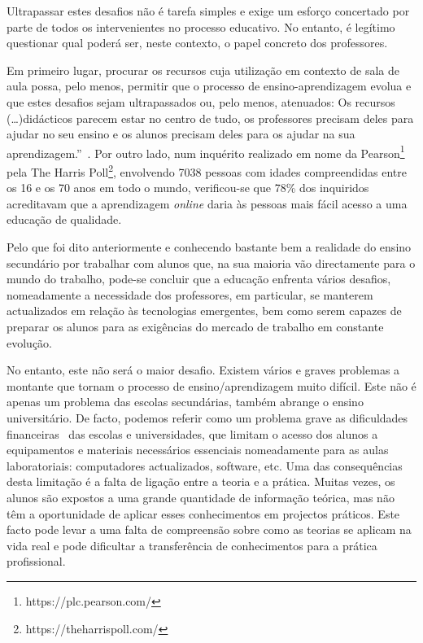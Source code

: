 Ultrapassar estes desafios não é tarefa simples e exige um esforço concertado por parte de todos os intervenientes no processo educativo. No entanto, é legítimo questionar qual poderá ser, neste contexto, o papel concreto dos professores.

Em primeiro lugar, procurar os recursos cuja utilização em contexto de sala de aula possa, pelo menos, permitir que o processo de ensino-aprendizagem evolua e que estes desafios sejam ultrapassados ou, pelo menos, atenuados: Os recursos (\ldots)didácticos parecem estar no centro de tudo, os professores precisam deles para ajudar no seu ensino e os alunos precisam deles para os ajudar na sua aprendizagem.''~\cite{virtuallabng}. Por outro lado, num inquérito \cite{pearson} realizado em nome da Pearson\footnote{https://plc.pearson.com/} pela The Harris Poll\footnote{https://theharrispoll.com/}, envolvendo 7038 pessoas com idades compreendidas entre os 16 e os 70 anos em todo o mundo, verificou-se que 78\% dos inquiridos acreditavam que a aprendizagem \textit{online} daria às pessoas mais fácil acesso a uma educação de qualidade. 

Pelo que foi dito anteriormente e conhecendo bastante bem a realidade do ensino secundário por trabalhar com alunos que, na sua maioria vão directamente para o mundo do trabalho, pode-se concluir que a educação enfrenta vários desafios, nomeadamente a necessidade dos professores, em particular, se manterem actualizados em relação às tecnologias emergentes, bem como serem capazes de preparar os alunos para as exigências do mercado de trabalho em constante evolução.

No entanto, este não será o maior desafio. Existem vários e graves problemas a montante que tornam o processo de ensino/aprendizagem muito difícil. Este não é apenas um problema das escolas secundárias, também abrange o ensino universitário. De facto, podemos referir como um problema grave as dificuldades financeiras~\cite{dificuldadesfinanciamento, Financiamentoprofissional, Educacaofinanciamento} das escolas e universidades, que limitam o acesso dos alunos a equipamentos e materiais necessários essenciais nomeadamente para as aulas laboratoriais: computadores actualizados, software, etc. Uma das consequências desta limitação é a falta de ligação entre a teoria e a prática. Muitas vezes, os alunos são expostos a uma grande quantidade de informação teórica, mas não têm a oportunidade de aplicar esses conhecimentos em projectos práticos. Este facto pode levar a uma falta de compreensão sobre como as teorias se aplicam na vida real e pode dificultar a transferência de conhecimentos para a prática profissional.

